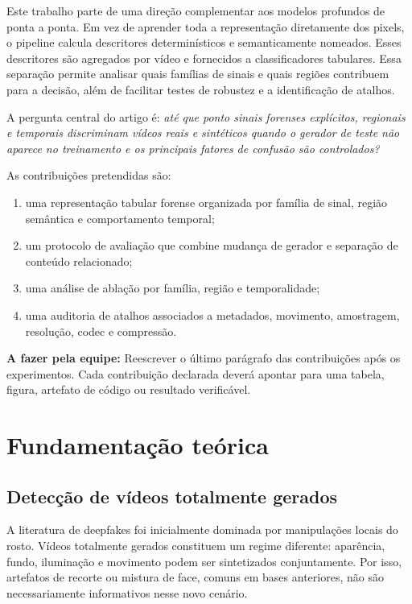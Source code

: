 \documentclass[11pt,a4paper]{article}
\newcommand{\afazer}[1]{%
  \par\smallskip
  \noindent\textcolor{red!70!black}{\textbf{A fazer pela equipe:} #1}
  \par\smallskip
}
\begin{document}
Este trabalho parte de uma direção complementar aos modelos profundos de ponta
a ponta. Em vez de aprender toda a representação diretamente dos pixels, o
pipeline calcula descritores determinísticos e semanticamente nomeados. Esses
descritores são agregados por vídeo e fornecidos a classificadores tabulares.
Essa separação permite analisar quais famílias de sinais e quais regiões
contribuem para a decisão, além de facilitar testes de robustez e a identificação
de atalhos.

A pergunta central do artigo é: \emph{até que ponto sinais forenses explícitos,
regionais e temporais discriminam vídeos reais e sintéticos quando o gerador de
teste não aparece no treinamento e os principais fatores de confusão são
controlados?}

As contribuições pretendidas são:

\begin{enumerate}
  \item uma representação tabular forense organizada por família de sinal,
        região semântica e comportamento temporal;
  \item um protocolo de avaliação que combine mudança de gerador e separação
        de conteúdo relacionado;
  \item uma análise de ablação por família, região e temporalidade;
  \item uma auditoria de atalhos associados a metadados, movimento,
        amostragem, resolução, codec e compressão.
\end{enumerate}

\afazer{Reescrever o último parágrafo das contribuições após os experimentos.
Cada contribuição declarada deverá apontar para uma tabela, figura, artefato de
código ou resultado verificável.}

\section{Fundamentação teórica}

\subsection{Detecção de vídeos totalmente gerados}

A literatura de deepfakes foi inicialmente dominada por manipulações locais do
rosto. Vídeos totalmente gerados constituem um regime diferente: aparência,
fundo, iluminação e movimento podem ser sintetizados conjuntamente. Por isso,
artefatos de recorte ou mistura de face, comuns em bases anteriores, não são
necessariamente informativos nesse novo cenário.
\end{document}
